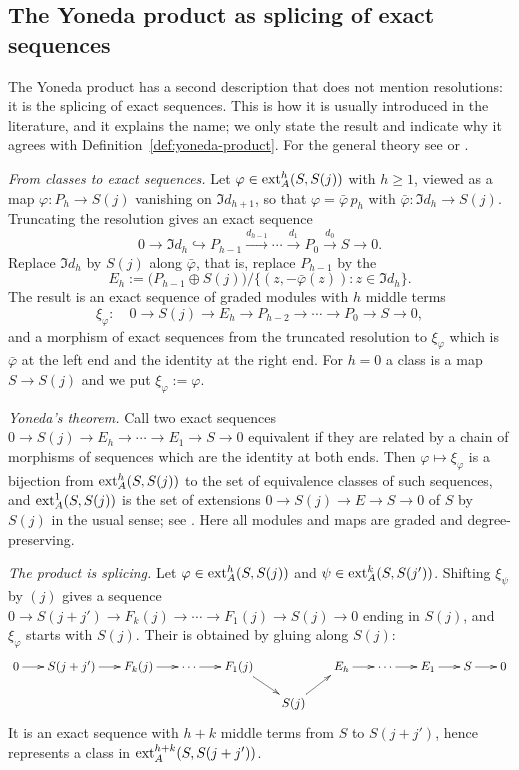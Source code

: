 \subsection{The Yoneda product as splicing of exact sequences}\label{subsec:yoneda-splicing}

\begin{advanced}
The Yoneda product has a second description that does not mention resolutions: it is the splicing of exact sequences.
This is how it is usually introduced in the literature, and it explains the name; we only state the result and indicate why it agrees with Definition~\ref{def:yoneda-product}.
For the general theory see \cite[Section~3.4]{Wei94} or \cite[Chapter~III, Sections~5--6]{ML95}.

\medskip
\noindent\emph{From classes to exact sequences.}
Let $\varphi\in\operatorname{ext}\nolimits_A^h(S,S(j))$ with $h\geq1$, viewed as a map $\varphi:P_h\to S(j)$ vanishing on $\Im d_{h+1}$, so that $\varphi=\bar\varphi\,p_h$ with $\bar\varphi:\Im d_h\to S(j)$.
Truncating the resolution gives an exact sequence
\[
0\to\Im d_h\hookrightarrow P_{h-1}\xrightarrow{d_{h-1}}\cdots\xrightarrow{d_1}P_0\xrightarrow{d_0}S\to0 .
\]
Replace $\Im d_h$ by $S(j)$ along $\bar\varphi$, that is, replace $P_{h-1}$ by the 
\[
E_h:=\bigl(P_{h-1}\oplus S(j)\bigr)\big/\{(z,-\bar\varphi(z)):z\in\Im d_h\}.
\]
The result is an exact sequence of graded modules with $h$ middle terms
\[
\xi_\varphi:\quad0\to S(j)\to E_h\to P_{h-2}\to\cdots\to P_0\to S\to0 ,
\]
and a morphism of exact sequences from the truncated resolution to $\xi_\varphi$ which is $\bar\varphi$ at the left end and the identity at the right end.
For $h=0$ a class is a map $S\to S(j)$ and we put $\xi_\varphi:=\varphi$.

\medskip
\noindent\emph{Yoneda's theorem.}
Call two exact sequences $0\to S(j)\to E_h\to\cdots\to E_1\to S\to0$ equivalent if they are related by a chain of morphisms of sequences which are the identity at both ends.
Then $\varphi\mapsto\xi_\varphi$ is a bijection from $\operatorname{ext}\nolimits_A^h(S,S(j))$ to the set of equivalence classes of such sequences, and $\operatorname{ext}\nolimits_A^1(S,S(j))$ is the set of extensions $0\to S(j)\to E\to S\to0$ of $S$ by $S(j)$ in the usual sense; see \cite[Theorem~3.4.3]{Wei94}.
Here all modules and maps are graded and degree-preserving.

\medskip
\noindent\emph{The product is splicing.}
Let $\varphi\in\operatorname{ext}\nolimits_A^h(S,S(j))$ and $\psi\in\operatorname{ext}\nolimits_A^k(S,S(j'))$.
Shifting $\xi_\psi$ by $(j)$ gives a sequence $0\to S(j+j')\to F_k(j)\to\cdots\to F_1(j)\to S(j)\to0$ ending in $S(j)$, and $\xi_\varphi$ starts with $S(j)$.
Their  is obtained by gluing along $S(j)$:
\[
\xymatrix@C=17pt@R=14pt{
0\ar[r]&S(j+j')\ar[r]&F_k(j)\ar[r]&\cdots\ar[r]&F_1(j)\ar[dr]&&E_h\ar[r]&\cdots\ar[r]&E_1\ar[r]&S\ar[r]&0\\
&&&&&S(j)\ar[ur]&&&&&
}
\]
It is an exact sequence with $h+k$ middle terms from $S$ to $S(j+j')$, hence represents a class in $\operatorname{ext}\nolimits_A^{h+k}(S,S(j+j'))$.


\end{advanced}
